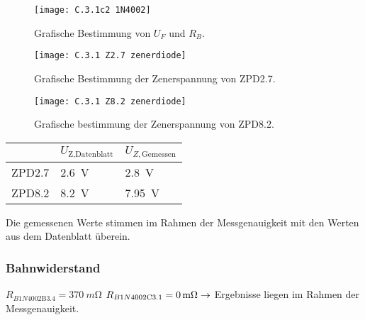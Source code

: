 \documentclass[
	a4paper, %
	12pt, %
]{CSUniSchoolLabReport}
\newcommand{\milli}{m}
\begin{document}
\begin{figure}[H] %
	\centering %
	\texttt{[image: C.3.1c2 1N4002]} %
	\caption{Grafische Bestimmung von $U_F$ und $R_B$.}
\end{figure}

\begin{figure}[H] %
	\centering %
	\texttt{[image: C.3.1 Z2.7 zenerdiode]} %
	\caption{Grafische Bestimmung der Zenerspannung von ZPD2.7.}
\end{figure}

\vspace{3em}

\begin{figure}[H] %
	\centering %
	\texttt{[image: C.3.1 Z8.2 zenerdiode]} %
	\caption{Grafische bestimmung der Zenerspannung von ZPD8.2.}
\end{figure}

\begin{table}[H]
\centering
\begin{tabular}{l|ll}
                            & $U_{\text{Z,Datenblatt}}$ & $U_{Z,\text{Gemessen}}$ \\
\hline
ZPD2.7                      &\SI{2,6}{\volt}                        &\SI{2,8}{\volt}                      \\
\hline
ZPD8.2                      &\SI{8,2}{\volt}                        &\SI{7,95}{\volt}                      \\                       
\end{tabular}
\end{table}

Die gemessenen Werte stimmen im Rahmen der Messgenauigkeit mit den Werten aus dem Datenblatt überein.

\subsubsection{Bahnwiderstand}
$R_{B1N4002\text{B3.4}} = \SI{370}{\milli\ohm}$ \qquad\qquad $R_{B1N4002\text{C3.1}} = \SI{0}{\milli\ohm}\\\\
\rightarrow $ Ergebnisse liegen im Rahmen der Messgenauigkeit. 
\end{document}
